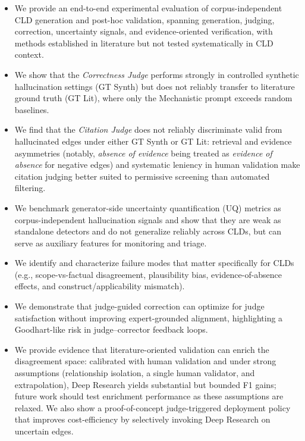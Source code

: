 \begin{itemize}[noitemsep]
    \item We provide an end-to-end experimental evaluation of corpus-independent CLD generation and post-hoc validation, spanning generation, judging, correction, uncertainty signals, and evidence-oriented verification, with methods established in literature but not tested systematically in CLD context.
    \item We show that the \textit{Correctness Judge} performs strongly in controlled synthetic hallucination settings (GT Synth) but does not reliably transfer to literature ground truth (GT Lit), where only the Mechanistic prompt exceeds random baselines.
    \item We find that the \textit{Citation Judge} does not reliably discriminate valid from hallucinated edges under either GT Synth or GT Lit: retrieval and evidence asymmetries (notably, \textit{absence of evidence} being treated as \textit{evidence of absence} for negative edges) and systematic leniency in human validation make citation judging better suited to permissive screening than automated filtering.
    \item We benchmark generator-side uncertainty quantification (UQ) metrics as corpus-independent hallucination signals and show that they are weak as standalone detectors and do not generalize reliably across CLDs, but can serve as auxiliary features for monitoring and triage.
    \item We identify and characterize failure modes that matter specifically for CLDs (e.g., scope-vs-factual disagreement, plausibility bias, evidence-of-absence effects, and construct/applicability mismatch).
    \item We demonstrate that judge-guided correction can optimize for judge satisfaction without improving expert-grounded alignment, highlighting a Goodhart-like risk in judge--corrector feedback loops.
    \item We provide evidence that literature-oriented validation can enrich the disagreement space: calibrated with human validation and under strong assumptions (relationship isolation, a single human validator, and extrapolation), Deep Research yields substantial but bounded F1 gains; future work should test enrichment performance as these assumptions are relaxed. We also show a proof-of-concept judge-triggered deployment policy that improves cost-efficiency by selectively invoking Deep Research on uncertain edges.
\end{itemize}

